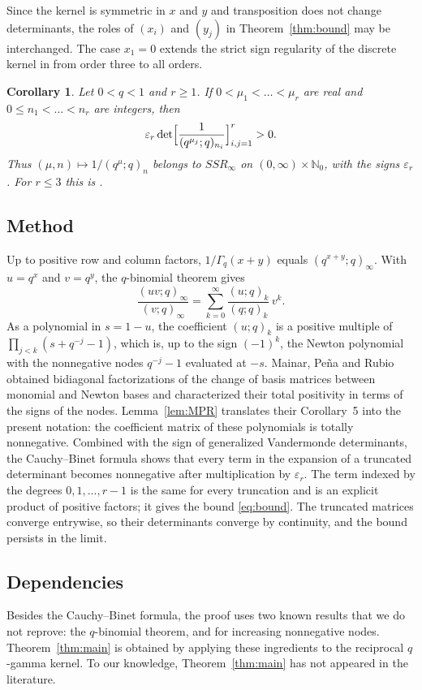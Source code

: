 \documentclass{amsart}
\newtheorem{corollary}[theorem]{Corollary}
\theoremstyle{remark}
\numberwithin{equation}{section}
\newcommand{\N}{\mathbb{N}}
\begin{document}
Since the kernel is symmetric in $x$ and $y$ and transposition does not change determinants, the roles of $(x_i)$ and $(y_j)$ in Theorem~\ref{thm:bound} may be interchanged. The case $x_1=0$ extends the strict sign regularity of the discrete kernel in \cite[Lemma~A.2]{KVZ} from order three to all orders.

\begin{corollary}\label{cor:discrete}
Let $0<q<1$ and $r\ge1$. If $0<\mu_1<\dots<\mu_r$ are real and $0\le n_1<\dots<n_r$ are integers, then
\[
\varepsilon_r\det\Bigl[\frac{1}{(q^{\mu_j};q)_{n_i}}\Bigr]_{i,j=1}^r>0.
\]
Thus $(\mu,n)\mapsto 1/(q^\mu;q)_n$ belongs to $SSR_\infty$ on $(0,\infty)\times\N_0$, with the signs $\varepsilon_r$. For $r\le3$ this is \cite[Lemma~A.2]{KVZ}.
\end{corollary}

\subsection*{Method}
Up to positive row and column factors, $1/\Gamma_q(x+y)$ equals $(q^{x+y};q)_\infty$. With $u=q^x$ and $v=q^y$, the $q$-binomial theorem gives
\[
\frac{(uv;q)_\infty}{(v;q)_\infty}=\sum_{k=0}^\infty\frac{(u;q)_k}{(q;q)_k}\,v^k .
\]
As a polynomial in $s=1-u$, the coefficient $(u;q)_k$ is a positive multiple of $\prod_{j<k}(s+q^{-j}-1)$, which is, up to the sign $(-1)^k$, the Newton polynomial with the nonnegative nodes $q^{-j}-1$ evaluated at $-s$. Mainar, Pe\~na and Rubio \cite{MPR} obtained bidiagonal factorizations of the change of basis matrices between monomial and Newton bases and characterized their total positivity in terms of the signs of the nodes. Lemma~\ref{lem:MPR} translates their Corollary~5 into the present notation: the coefficient matrix of these polynomials is totally nonnegative. Combined with the sign of generalized Vandermonde determinants, the Cauchy--Binet formula shows that every term in the expansion of a truncated determinant becomes nonnegative after multiplication by $\varepsilon_r$. The term indexed by the degrees $0,1,\dots,r-1$ is the same for every truncation and is an explicit product of positive factors; it gives the bound \eqref{eq:bound}. The truncated matrices converge entrywise, so their determinants converge by continuity, and the bound persists in the limit.

\subsection*{Dependencies}
Besides the Cauchy--Binet formula, the proof uses two known results that we do not reprove: the $q$-binomial theorem, and \cite[Corollary~5]{MPR} for increasing nonnegative nodes. Theorem~\ref{thm:main} is obtained by applying these ingredients to the reciprocal $q$-gamma kernel. To our knowledge, Theorem~\ref{thm:main} has not appeared in the literature.
\end{document}
